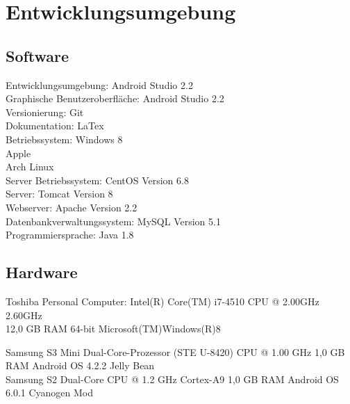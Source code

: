 \section{Entwicklungsumgebung}

\subsection{Software}
Entwicklungsumgebung: 				Android Studio 2.2\\
Graphische Benutzeroberfläche: 		Android Studio 2.2\\
Versionierung: 						Git\\
Dokumentation:						LaTex\\
Betriebssystem: 					Windows 8\\
									Apple\\
								     Arch Linux\\
Server Betriebssystem:				CentOS Version 6.8\\
Server:								Tomcat Version 8\\
Webserver:							Apache Version 2.2\\
Datenbankverwaltungssystem: 		MySQL Version 5.1\\
Programmiersprache:					Java 1.8\\

\subsection{Hardware}

Toshiba Personal Computer:			Intel(R) Core(TM) i7-4510 CPU @ 2.00GHz 2.60GHz\\
									12,0 GB RAM
									64-bit Microsoft(TM)Windows(R)8

Samsung S3 Mini						Dual-Core-Prozessor (STE U-8420) CPU @ 1.00 GHz
									1,0 GB RAM
									Android OS 4.2.2 Jelly Bean\\

Samsung S2                                   Dual-Core CPU @ 1.2 GHz Cortex-A9
                                             1,0 GB RAM
                                             Android OS 6.0.1 Cyanogen Mod\\

